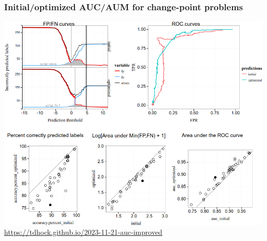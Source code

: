 \documentclass[t]{beamer}
\begin{document}
\begin{frame}
  \frametitle{Initial/optimized AUC/AUM for change-point problems}
  \centering
  \includegraphics[height=0.7\textheight]{figure-auc-improved-interactive-screenshot}
  \url{https://tdhock.github.io/2023-11-21-auc-improved}
\end{frame}
\end{document}
